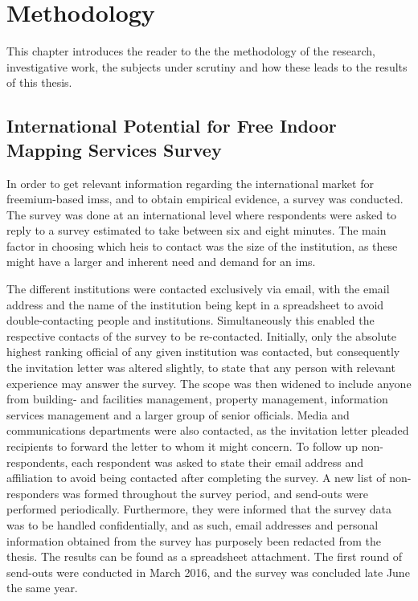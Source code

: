 \chapter{Methodology}
This chapter introduces the reader to the the methodology of the research, investigative work, the subjects under scrutiny and how these leads to the results of this thesis.

\section{International Potential for Free Indoor Mapping Services Survey}
In order to get relevant information regarding the international market for freemium-based \glspl{ims}, and to obtain empirical evidence, a survey was conducted. The survey was done at an international level where respondents were asked to reply to a survey estimated to take between six and eight minutes. The main factor in choosing which \glspl{hei} to contact was the size of the institution, as these might have a larger and inherent need and demand for an \gls{ims}. 


The different institutions were contacted exclusively via email, with the email address and the name of the institution being kept in a spreadsheet to avoid double-contacting people and institutions. Simultaneously this enabled the respective contacts of the survey to be re-contacted. Initially, only the absolute highest ranking official of any given institution was contacted, but consequently the invitation letter was altered slightly, to state that any person with relevant experience may answer the survey. The scope was then widened to include anyone from building- and facilities management, property management, information services management and a larger group of senior officials. Media and communications departments were also contacted, as the invitation letter pleaded recipients to forward the letter to whom it might concern. To follow up non-respondents, each respondent was asked to state their email address and affiliation to avoid being contacted after completing the survey. A new list of non-responders was formed throughout the survey period, and send-outs were performed periodically. Furthermore, they were informed that the survey data was to be handled confidentially, and as such, email addresses and personal information obtained from the survey has purposely been redacted from the thesis. The results can be found as a spreadsheet attachment. The first round of send-outs were conducted in March 2016, and the survey was concluded late June the same year. 

